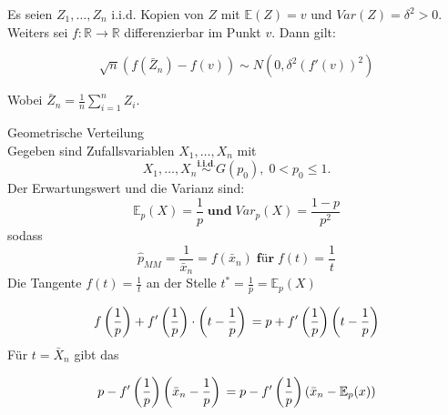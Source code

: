 \documentclass[10pt]{article}
\newcommand{\FZV}{X_1, \ldots, X_n} %
\newcommand{\IR}{\mathbb{R}} %
\newcommand{\EW}{\mathbb{E}} %
\newenvironment{BSP}[1][]
{\begin{Beispiel}[frametitle=#1]}{\end{Beispiel}}
\begin{document}
	\noindent Es seien $Z_1, \ldots, Z_n$ i.i.d. Kopien von $Z$ mit $\EW(Z)=v$ und $Var(Z)=\delta^2 > 0$. Weiters sei $f: \IR \rightarrow \IR$ differenzierbar im Punkt $v$. Dann gilt:
	
	\begin{equation*}
		\sqrt{n} (f(\bar{Z}_n)-f(v)) \sim N(0, \delta^2 (f'(v))^2)
	\end{equation*}
	
	\noindent Wobei $\bar{Z}_n =  \frac{1}{n}\sum_{i=1}^{n} Z_i$.
	
	\begin{BSP}[Beispiel 1..... (Delta-Methode)]
		
		Geometrische Verteilung \\
		Gegeben sind Zufallsvariablen $\FZV$ mit
		\begin{equation*}
			\FZV \overset{\textbf{i.i.d.}}{\sim} G(p_0), \; 0 < p_0 \leq 1.
		\end{equation*} 
		Der Erwartungswert und die Varianz sind:
		\begin{equation*}
			\EW_p(X) = \frac{1}{p} \; \textbf{und} \; Var_p(X) = \frac{1-p}{p^2}
		\end{equation*}
		sodass
		\begin{equation*}
			\hat{p}_{MM} = \frac{1}{\bar{x}_n} = f(\bar{x}_n) \; \textbf{für} \; f(t)= \frac{1}{t}
		\end{equation*} 
		Die Tangente $f(t) = \frac{1}{t}$ an der Stelle $t^* = \frac{1}{p} = \EW_p(X)$
		
		\begin{equation*}
			f\left(\frac{1}{p}\right) + f'\left(\frac{1}{p}\right) \cdot \left(t-\frac{1}{p}\right)\\
			= p + f'\left(\frac{1}{p}\right) \left(t-\frac{1}{p}\right)
		\end{equation*}
		Für $t=\bar{X}_n$ gibt das
		
		\begin{equation*}
			p - f'\left(\frac{1}{p}\right) \left(\bar{x}_n - \frac{1}{p}\right) \\
			= p - f'\left(\frac{1}{p}\right) (\bar{x}_n - \EW_p(x))
		\end{equation*}
		
	\end{BSP}
	
\end{document}
